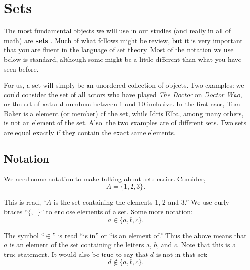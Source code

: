 \documentclass[10pt,]{book}
\newcommand{\terminology}[1]{\textbf{#1}}
\theoremstyle{plain}
\theoremstyle{definition}
\theoremstyle{definition}
\theoremstyle{definition}
\numberwithin{equation}{section}
\begin{document}
\section[Sets]{Sets}\label{sec_intro-sets}
\typeout{************************************************}
\typeout{************************************************}

      The most fundamental objects we will use in our studies (and really in all of math) are
      \terminology{sets}
      . Much of what follows might be review, but it is very important that you are fluent in the language of set theory. Most of the notation we use below is standard, although some might be a little different than what you have seen before.
\par

      For us, a set will simply be an unordered collection of objects. Two examples: we could consider the set of all actors who have played \emph{The Doctor} on \emph{Doctor Who}, or the
      set of natural numbers between 1 and 10 inclusive. In the first case, Tom Baker is a element (or member) of the set, while Idris Elba, among many others, is not an element of the set. Also, the two examples are of different sets. Two sets are equal
      exactly if they contain the exact same elements.
\typeout{************************************************}
\typeout{************************************************}
\subsection[Notation]{Notation}\label{subsec_notation}

      We need some notation to make talking about sets easier. Consider,
      \begin{equation*}
        A = \{1, 2, 3\}.
      \end{equation*}
\par

      This is read, ``\(A\) is the set containing the elements 1, 2 and 3.'' We use curly braces ``\(\{,~~ \}\)'' to enclose elements of a set. Some more notation:
      \begin{equation*}
        a \in \{a, b, c\}.
      \end{equation*}
\par

      The symbol ``\(\in\)'' is read ``is in'' or ``is an element of.'' Thus the above means that \(a\) is an element of the set containing the letters \(a\), \(b\), and \(c\). Note that this is a true statement. It would also
      be true to say that \(d\) is not in that set:
      \begin{equation*}
        d \not\in \{a, b, c\}.
      \end{equation*}
\par
\end{document}
